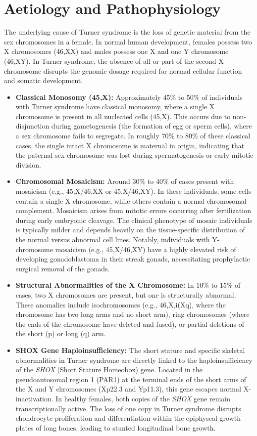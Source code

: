 \section*{Aetiology and Pathophysiology}
The underlying cause of Turner syndrome is the loss of genetic material from the sex chromosomes in a female. In normal human development, females possess two X chromosomes (46,XX) and males possess one X and one Y chromosome (46,XY). In Turner syndrome, the absence of all or part of the second X chromosome disrupts the genomic dosage required for normal cellular function and somatic development.
\begin{itemize}
    \item \textbf{Classical Monosomy (45,X):} Approximately 45\% to 50\% of individuals with Turner syndrome have classical monosomy, where a single X chromosome is present in all nucleated cells (45,X). This occurs due to non-disjunction during gametogenesis (the formation of egg or sperm cells), where a sex chromosome fails to segregate. In roughly 70\% to 80\% of these classical cases, the single intact X chromosome is maternal in origin, indicating that the paternal sex chromosome was lost during spermatogenesis or early mitotic division.
    \item \textbf{Chromosomal Mosaicism:} Around 30\% to 40\% of cases present with mosaicism (e.g., 45,X/46,XX or 45,X/46,XY). In these individuals, some cells contain a single X chromosome, while others contain a normal chromosomal complement. Mosaicism arises from mitotic errors occurring after fertilization during early embryonic cleavage. The clinical phenotype of mosaic individuals is typically milder and depends heavily on the tissue-specific distribution of the normal versus abnormal cell lines. Notably, individuals with Y-chromosome mosaicism (e.g., 45,X/46,XY) have a highly elevated risk of developing gonadoblastoma in their streak gonads, necessitating prophylactic surgical removal of the gonads.
    \item \textbf{Structural Abnormalities of the X Chromosome:} In 10\% to 15\% of cases, two X chromosomes are present, but one is structurally abnormal. These anomalies include isochromosomes (e.g., 46,X,i(Xq), where the chromosome has two long arms and no short arm), ring chromosomes (where the ends of the chromosome have deleted and fused), or partial deletions of the short (p) or long (q) arm.
    \item \textbf{SHOX Gene Haploinsufficiency:} The short stature and specific skeletal abnormalities in Turner syndrome are directly linked to the haploinsufficiency of the \textit{SHOX} (Short Stature Homeobox) gene. Located in the pseudoautosomal region 1 (PAR1) at the terminal ends of the short arms of the X and Y chromosomes (Xp22.3 and Yp11.3), this gene escapes normal X-inactivation. In healthy females, both copies of the \textit{SHOX} gene remain transcriptionally active. The loss of one copy in Turner syndrome disrupts chondrocyte proliferation and differentiation within the epiphyseal growth plates of long bones, leading to stunted longitudinal bone growth.

\end{itemize}
